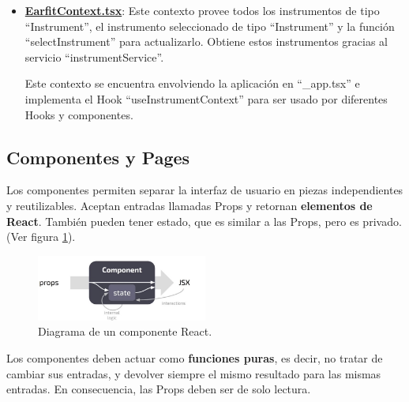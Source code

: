 \documentclass[12pt,twoside,titlepage]{report}
\begin{document}

\begin{itemize}
    \item \href{https://github.com/alberttogoca/EarFit/blob/main/src/context/EarfitContext.tsx}{\textbf{EarfitContext.tsx}}: Este contexto provee todos los instrumentos de tipo ``Instrument\text{[]}'', el instrumento seleccionado de tipo ``Instrument'' y la función ``selectInstrument'' para actualizarlo. Obtiene estos instrumentos gracias al servicio ``instrumentService''.    
    
    Este contexto se encuentra envolviendo la aplicación en ``\_app.tsx'' e implementa el Hook ``useInstrumentContext'' para ser usado por diferentes Hooks y componentes.
\end{itemize}

\subsection{Componentes y Pages}
\label{sec:componentes}

Los componentes permiten separar la interfaz de usuario en piezas independientes y reutilizables. Aceptan entradas llamadas Props y retornan \textbf{elementos de React}. También pueden tener estado, que es similar a las Props, pero es privado.
(Ver figura \ref{fig:ReactComponent}).

\begin{figure}[H]
    \centering
    \includegraphics[width=0.5\textwidth]{React/ReactComponent}
    \caption{Diagrama de un componente React.}
    \label{fig:ReactComponent}
\end{figure}

Los componentes deben actuar como \textbf{funciones puras}, es decir, no tratar de cambiar sus entradas, y devolver siempre el mismo resultado para las mismas entradas. En consecuencia, las Props deben ser de solo lectura. 
\cite{components1}
\end{document}

